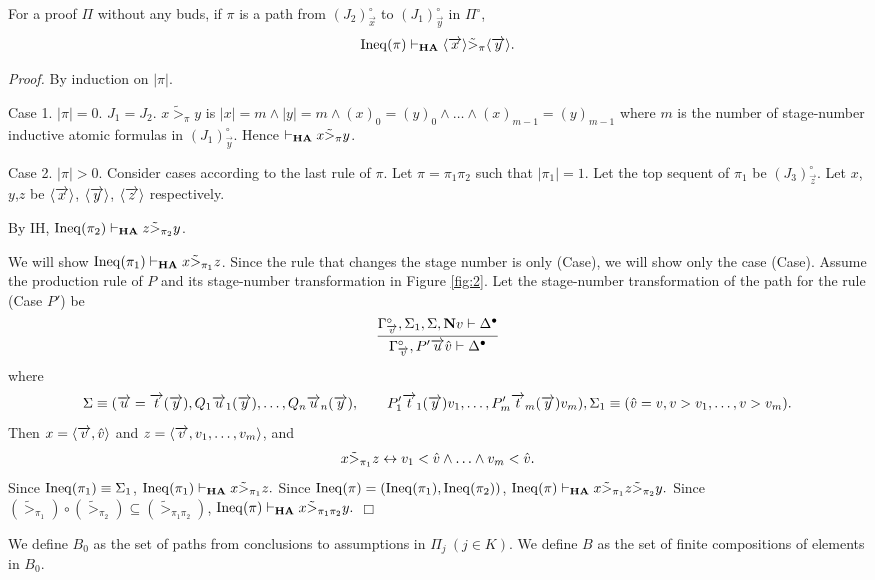 \begin{Lemma}\label{lemma:decrease}
For a proof $\Pi$ without any buds,
if $\pi$ is a path from $(J_2)^\circ_{\Vec x}$ to $(J_1)^\circ_{\Vec y}$ in $\Pi^\circ$,
\[
\Ineq(\pi) \prove_\HA \<\Vec x\>  \tilde>_{ \pi} \<\Vec y\>.
\]
\end{Lemma}

{\em Proof.}
By induction on $|\pi|$. 

Case 1. $|\pi|=0$.
$J_1 = J_2$. $x \tilde>_{ \pi} y$ is
$|x|=m \land |y|=m \land (x)_0=(y)_0 \land \ldots \land (x)_{m-1}=(y)_{m-1}$
where $m$ is the number of stage-number inductive atomic formulas in $(J_1)^\circ_{\Vec y}$.
Hence $\prove_\HA x \tilde>_{ \pi} y$.

Case 2. $|\pi|>0$.
Consider cases according to the last rule of $\pi$.
Let $\pi=\pi_1\pi_2$ such that $|\pi_1|=1$.
Let the top sequent of $\pi_1$ be $(J_3)^\circ_{\Vec z}$.
Let $x$,$y$,$z$ be $\<\Vec x\>$, $\<\Vec y\>$, $\<\Vec z\>$ respectively.

By IH, $\Ineq(\pi_2) \prove_\HA z \tilde>_{ \pi_2} y$.

We will show $\Ineq(\pi_1) \prove_\HA x \tilde>_{ \pi_1} z$.
Since the rule that changes the stage number is only (Case),
we will show only the case (Case).
Assume the production rule of $P$ 
and its stage-number transformation in Figure \ref{fig:2}.
Let the stage-number transformation of the path for the rule (Case $P'$) be
\[
\infer{\Gamma^\circ_{\Vec v}, P'\Vec u\hat v \prove \Delta^\bullet}{
\Gamma^\circ_{\Vec v}, \Sigma_1,\Sigma, \N v \prove \Delta^\bullet
}
\]
where
\[
\Sigma \equiv (\Vec u=\Vec t(\Vec y), Q_1\Vec u_1(\Vec y), \ldots, Q_n\Vec u_n(\Vec y),
\\ \qquad
P'_1\Vec t_1(\Vec y)v_1, \ldots, P'_m\Vec t_m(\Vec y)v_m), \\
\Sigma_1 \equiv (\hat v=v,v > v_1,\ldots,v > v_m).
\]
Then $x=\<\Vec v,\hat v\>$ and $z=\<\Vec v,v_1,\ldots,v_m\>$, and
\[
x \tilde>_{ \pi_1} z \lequiv v_1 < \hat v \land \ldots \land v_m < \hat v.
\]
Since $\Ineq(\pi_1) \equiv \Sigma_1$,
$
\Ineq(\pi_1) \prove_\HA x \tilde>_{ \pi_1} z.
$
Since $\Ineq(\pi) = (\Ineq(\pi_1), \Ineq(\pi_2))$,
$
\Ineq(\pi) \prove_\HA 
x \tilde>_{ \pi_1} z \tilde>_{ \pi_2} y.
$
Since 
$(\tilde>_{ \pi_1}) \circ (\tilde>_{ \pi_2}) \subseteq (\tilde>_{\pi_1\pi_2})$,
$
\Ineq(\pi) \prove_\HA x \tilde>_{ \pi_1\pi_2} y.
$
$\Box$

We define $B_0$ as the set of paths from conclusions to assumptions in 
$\Pi_j \ (j \in K)$.
We define $B$ as the set of finite compositions of elements in $B_0$.

